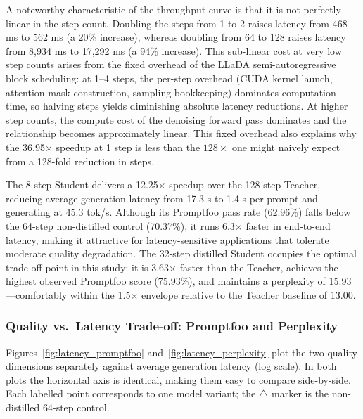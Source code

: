 \documentclass[11pt, a4paper]{article}
\begin{document}
A noteworthy characteristic of the throughput curve is that it is not perfectly linear in the step count. Doubling the steps from 1 to 2 raises latency from 468 ms to 562 ms (a 20\% increase), whereas doubling from 64 to 128 raises latency from 8{,}934 ms to 17{,}292 ms (a 94\% increase). This sub-linear cost at very low step counts arises from the fixed overhead of the LLaDA semi-autoregressive block scheduling: at 1--4 steps, the per-step overhead (CUDA kernel launch, attention mask construction, sampling bookkeeping) dominates computation time, so halving steps yields diminishing absolute latency reductions. At higher step counts, the compute cost of the denoising forward pass dominates and the relationship becomes approximately linear. This fixed overhead also explains why the 36.95$\times$ speedup at 1 step is less than the $128\times$ one might naively expect from a 128-fold reduction in steps.

The 8-step Student delivers a 12.25$\times$ speedup over the 128-step Teacher, reducing average generation latency from 17.3 s to 1.4 s per prompt and generating at 45.3 tok/s. Although its Promptfoo pass rate (62.96\%) falls below the 64-step non-distilled control (70.37\%), it runs 6.3$\times$ faster in end-to-end latency, making it attractive for latency-sensitive applications that tolerate moderate quality degradation. The 32-step distilled Student occupies the optimal trade-off point in this study: it is 3.63$\times$ faster than the Teacher, achieves the highest observed Promptfoo score (75.93\%), and maintains a perplexity of 15.93---comfortably within the 1.5$\times$ envelope relative to the Teacher baseline of 13.00.

\subsubsection{Quality vs.\ Latency Trade-off: Promptfoo and Perplexity}
\label{subsubsec:quality_latency_tradeoff}

Figures~\ref{fig:latency_promptfoo} and~\ref{fig:latency_perplexity} plot the two quality dimensions separately against average generation latency (log scale). In both plots the horizontal axis is identical, making them easy to compare side-by-side. Each labelled point corresponds to one model variant; the $\triangle$ marker is the non-distilled 64-step control.
\end{document}
